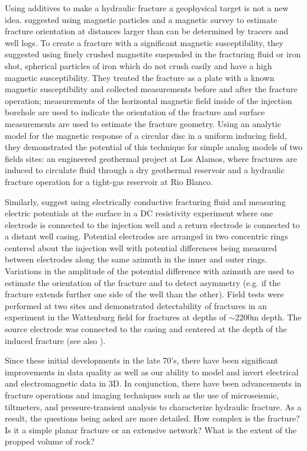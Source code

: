 Using additives to make a hydraulic fracture a geophysical target is not a new idea. \cite{Byerlee1976} suggested using magnetic particles and a magnetic survey to estimate fracture orientation at distances larger than can be determined by tracers and well logs. To create a fracture with a significant magnetic susceptibility, they suggested using finely crushed magnetite suspended in the fracturing fluid or iron shot, spherical particles of iron which do not crush easily and have a high magnetic susceptibility. They treated the fracture as a plate with a known magnetic susceptibility and collected measurements before and after the fracture operation; measurements of the horizontal magnetic field inside of the injection borehole are used to indicate the orientation of the fracture and surface measurements are used to estimate the fracture geometry. Using an analytic model for the magnetic response of a circular disc in a uniform inducing field, they demonstrated the potential of this technique for simple analog models of two fields sites: an engineered geothermal project at Los Alamos, where fractures are induced to circulate fluid through a dry geothermal reservoir and a hydraulic fracture operation for a tight-gas reservoir at Rio Blanco.

Similarly, \cite{Bartel1976} suggest using electrically conductive fracturing fluid and measuring electric potentials at the surface in a DC resistivity experiment where one electrode is connected to the injection well and a return electrode is connected to a distant well casing. Potential electrodes are arranged in two concentric rings centered about the injection well with potential differences being measured between electrodes along the same azimuth in the inner and outer rings. Variations in the amplitude of the potential difference with azimuth are used to estimate the orientation of the fracture and to detect asymmetry (e.g. if the fracture extends further one side of the well than the other). Field tests were performed at two sites and demonstrated detectability of fractures in an experiment in the Wattenburg field for fractures at depths of $\sim$2200m depth. The source electrode was connected to the casing and centered at the depth of the induced fracture (see also \cite{Smith1978}).

Since these initial developments in the late 70's, there have been significant improvements in data quality as well as our ability to model and invert electrical and electromagnetic data in 3D. In conjunction, there have been advancements in fracture operations and imaging techniques such as the use of microseismic, tiltmeters, and pressure-transient analysis to characterize hydraulic fracture. As a result, the questions being asked are more detailed. How complex is the fracture? Is it a simple planar fracture or an extensive network? What is the extent of the propped volume of rock?


